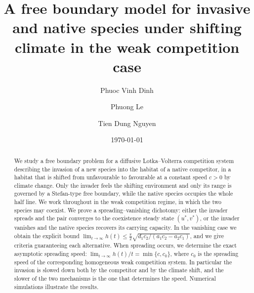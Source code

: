 \documentclass[reqno]{amsart}
\theoremstyle{plain}
\theoremstyle{definition}
\theoremstyle{remark}
\begin{document}
\author{Phuoc Vinh Dinh}
\address{Phuoc Vinh Dinh$^{1,2,3}$ (ORCID: 0009-0000-6297-7798)\newline
	$^1$Faculty of Applied Sciences, Ho Chi Minh City University of Technology (HCMUT), 268 Ly Thuong Kiet Street, Dien Hong Ward, Ho Chi Minh City, Vietnam;\newline
	$^2$Vietnam National University, Ho Chi Minh City, Vietnam\newline
	$^3$Department of Mathematics, FPT University, Ho Chi Minh City, Vietnam}

\author{Phuong Le}
\address{Phuong Le$^{4,2}$ (ORCID: 0000-0003-4724-7118)\newline
	$^4$Faculty of Economic Mathematics, University of Economics and Law, Ho Chi Minh City, Vietnam; \newline
	$^2$Vietnam National University, Ho Chi Minh City, Vietnam}

\author{Tien Dung Nguyen}
\address{Tien Dung Nguyen$^{1,2}$\newline
	$^1$Faculty of Applied Sciences, Ho Chi Minh City University of Technology (HCMUT), 268 Ly Thuong Kiet Street, Dien Hong Ward, Ho Chi Minh City, Vietnam;\newline
	$^2$Vietnam National University, Ho Chi Minh City, Vietnam}

\title[A free boundary model for invasive and native species]{A free boundary model for invasive and native species under shifting climate in the weak competition case}

\date{\today}

\begin{abstract}
	We study a free boundary problem for a diffusive Lotka--Volterra competition system describing the invasion of a new species into the habitat of a native competitor, in a habitat that is shifted from unfavourable to favourable at a constant speed $c>0$ by climate change. Only the invader feels the shifting environment and only its range is governed by a Stefan-type free boundary, while the native species occupies the whole half line. We work throughout in the weak competition regime, in which the two species may coexist. We prove a spreading--vanishing dichotomy: either the invader spreads and the pair converges to the coexistence steady state $(u^*,v^*)$, or the invader vanishes and the native species recovers its carrying capacity. In the vanishing case we obtain the explicit bound $\lim_{t\to\infty}h(t)\le\frac{\pi}{2}\sqrt{d_1c_2/(a_1c_2-a_2c_1)}$, and we give criteria guaranteeing each alternative. When spreading occurs, we determine the exact asymptotic spreading speed: $\lim_{t\to\infty}h(t)/t=\min\{c,c_0\}$, where $c_0$ is the spreading speed of the corresponding homogeneous weak competition system. In particular the invasion is slowed down both by the competitor and by the climate shift, and the slower of the two mechanisms is the one that determines the speed. Numerical simulations illustrate the results.
\end{abstract}
\end{document}
